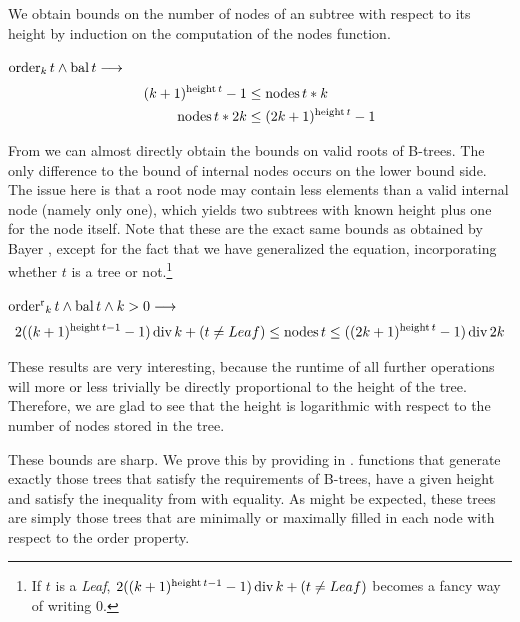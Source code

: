We obtain bounds
on the number of nodes of an subtree with respect to its height
by induction on the computation of the nodes function.

\begin{lemma}
    \label{lem:bound_internal_node}
    $\operatorname{order}_k t \wedge \operatorname{bal} t \longrightarrow$
    \begin{align}
        (k+1)^{\operatorname{height} t} - 1 &\le \operatorname{nodes} t * k \\
        \operatorname{nodes} t * 2k &\le (2k+1)^{\operatorname{height} t} - 1
    \end{align}
\end{lemma}

From  we can almost directly obtain
the bounds on valid roots of B-trees.
The only difference to the bound of internal nodes occurs on the lower bound side.
The issue here is that a root node may contain less elements than
a valid internal node (namely only one), which yields two subtrees with known height
plus one for the node itself.
Note that these are the exact same bounds as obtained by Bayer \parencite{DBLP:journals/acta/BayerM72},
except for the fact that we have generalized the equation,
incorporating whether $t$ is a tree or not.\footnote{
    If $t$ is a \textit{Leaf},
    $2((k+1)^{\operatorname{height} t - 1} - 1) \operatorname{div} k + (t \neq Leaf)$ becomes a fancy way of writing $0$.
}

\begin{theorem}
    \label{thm:bound_btree}
    $\operatorname{order^r}_k t \wedge \operatorname{bal} t \wedge k > 0 \longrightarrow$
    \begin{equation}
        2((k+1)^{\operatorname{height} t - 1} - 1) \operatorname{div} k + (t \neq Leaf) \le \operatorname{nodes} t \le ((2k+1)^{\operatorname{height} t} - 1) \operatorname{div} 2k
    \end{equation}
\end{theorem}

These results are very interesting, because
the runtime of all further operations will more or less trivially be
directly proportional to the height of the tree.
Therefore, we are glad to see that the height is logarithmic
with respect to the number of nodes stored in the tree.

These bounds are sharp.
We prove this by providing in .
functions that generate exactly those trees
that satisfy the requirements of B-trees, have a given height
and satisfy the inequality from 
with equality.
As might be expected, these trees are simply those trees
that are minimally or maximally filled in each node with respect
to the order property.

